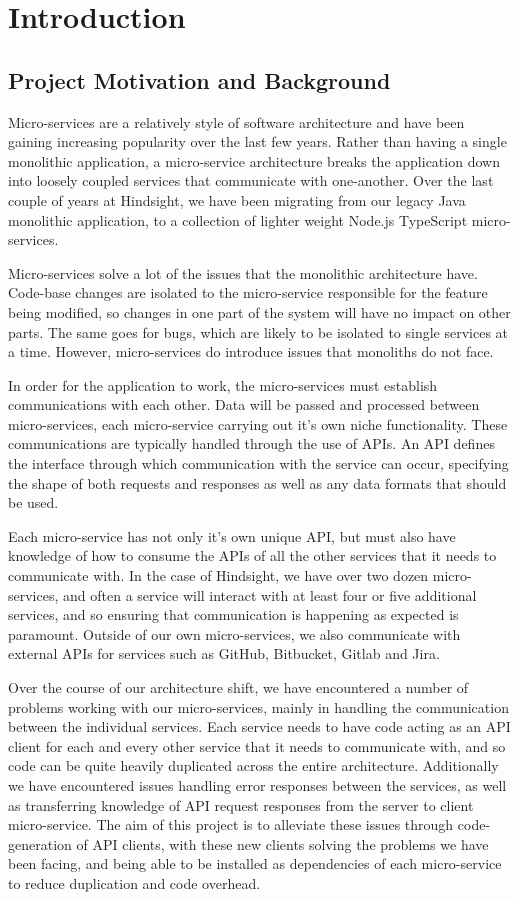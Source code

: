 \chapter{Introduction}
\section{Project Motivation and Background}

Micro-services are a relatively style of software architecture and have been gaining increasing popularity over the last few years. Rather than having a single monolithic application, a micro-service architecture breaks the application down into loosely coupled services that communicate with one-another. Over the last couple of years at Hindsight, we have been migrating from our legacy Java monolithic application, to a collection of lighter weight Node.js TypeScript micro-services.

Micro-services solve a lot of the issues that the monolithic architecture have. Code-base changes are isolated to the micro-service responsible for the feature being modified, so changes in one part of the system will have no impact on other parts. The same goes for bugs, which are likely to be isolated to single services at a time. However, micro-services do introduce issues that monoliths do not face.

In order for the application to work, the micro-services must establish communications with each other. Data will be passed and processed between micro-services, each micro-service carrying out it's own niche functionality. These communications are typically handled through the use of APIs. An API defines the interface through which communication with the service can occur, specifying the shape of both requests and responses as well as any data formats that should be used.

Each micro-service has not only it's own unique API, but must also have knowledge of how to consume the APIs of all the other services that it needs to communicate with. In the case of Hindsight, we have over two dozen micro-services, and often a service will interact with at least four or five additional services, and so ensuring that communication is happening as expected is paramount. Outside of our own micro-services, we also communicate with  external APIs for services such as GitHub, Bitbucket, Gitlab and Jira.

Over the course of our architecture shift, we have encountered a number of problems working with our micro-services, mainly in handling the communication between the individual services. Each service needs to have code acting as an API client for each and every other service that it needs to communicate with, and so code can be quite heavily duplicated across the entire architecture. Additionally we have encountered issues handling error responses between the services, as well as transferring knowledge of API request responses from the server to client micro-service. The aim of this project is to alleviate these issues through code-generation of API clients, with these new clients solving the problems we have been facing, and being able to be installed as dependencies of each micro-service to reduce duplication and code overhead.

